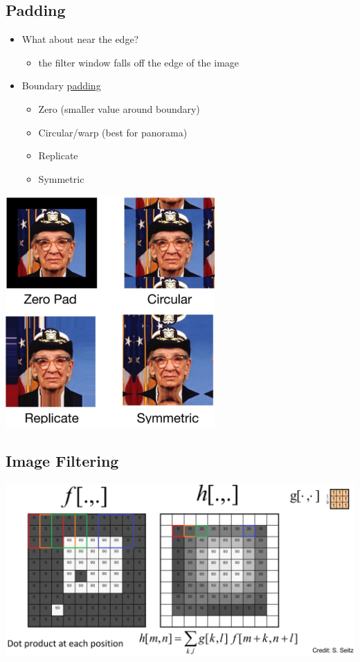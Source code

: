 \documentclass[10pt]{article}
\begin{document}
\subsection*{Padding}
\begin{itemize}
	\item What about near the edge?
	\begin{itemize}
        \item the filter window falls off the edge of the image
    \end{itemize}
	\item Boundary \underline{padding}
	\begin{itemize}
        \item Zero (smaller value around boundary)
        \item Circular/warp (best for panorama)
        \item Replicate
        \item Symmetric        
    \end{itemize}
\end{itemize}
\begin{center} 
	\includegraphics*[width=0.6\textwidth]{L2_8.png} 
\end{center}

\subsection*{Image Filtering}
\begin{center} 
	\includegraphics*[width=\textwidth]{L2_9.png} 
\end{center}
\end{document}
